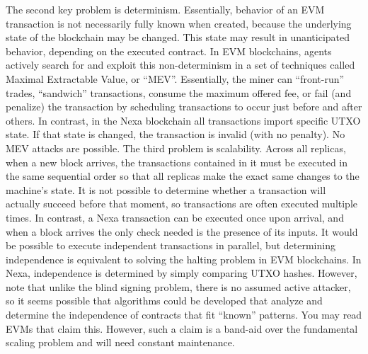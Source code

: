 \documentclass[a4paper, 11pt]{article}
\begin{document}
The second key problem is determinism.  Essentially, behavior of an EVM transaction is not necessarily fully known when created, because the underlying state of the blockchain may be changed.  This state may result in unanticipated behavior, depending on the executed contract.  In EVM blockchains, agents actively search for and exploit this non-determinism in a set of techniques called Maximal Extractable Value, or “MEV”.  Essentially, the miner can “front-run” trades, “sandwich” transactions, consume the maximum offered fee, or fail (and penalize) the transaction by scheduling transactions to occur just before and after others.  In contrast, in the Nexa blockchain all transactions import specific UTXO state.  If that state is changed, the transaction is invalid (with no penalty).  No MEV attacks are possible.
The third problem is scalability.  Across all replicas, when a new block arrives, the transactions contained in it must be executed in the same sequential order so that all replicas make the exact same changes to the machine’s state.  It is not possible to determine whether a transaction will actually succeed before that moment, so transactions are often executed multiple times.  In contrast, a Nexa transaction can be executed once upon arrival, and when a block arrives the only check needed is the presence of its inputs.
It would be possible to execute independent transactions in parallel, but determining independence is equivalent to solving the halting problem in EVM blockchains.  In Nexa, independence is determined by simply comparing UTXO hashes.  However, note that unlike the blind signing problem, there is no assumed active attacker, so it seems possible that algorithms could be developed that analyze and determine the independence of contracts that fit “known” patterns.  You may read EVMs that claim this.  However, such a claim is a band-aid over the fundamental scaling problem and will need constant maintenance.
\end{document}
